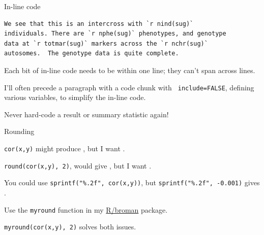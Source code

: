 \documentclass[12pt,t]{beamer}
\begin{document}
\begin{frame}[fragile]{In-line code}

\vspace{24pt}

\begin{lstlisting}
We see that this is an intercross with `r nind(sug)`
individuals. There are `r nphe(sug)` phenotypes, and genotype
data at `r totmar(sug)` markers across the `r nchr(sug)`
autosomes.  The genotype data is quite complete.
\end{lstlisting}

\vfill

\bi
\itemsep12pt
\item Each bit of in-line code needs to be within one line; they
  {\hilit can't}
  span across lines.
\item I'll often precede a paragraph with a code chunk with {\tt
  include=FALSE}, defining various variables, to simplify the in-line
  code.
\item Never hard-code a result or summary statistic again!
\ei

\end{frame}


\begin{frame}{Rounding}

\vspace{24pt}

\bi
\itemsep18pt
\item {\tt cor(x,y)} might produce {\tt {}}, but
I want {\tt {}}.

\item {\tt round(cor(x,y), 2)}, would give {\tt {}}, but I want
{\tt {}}.

\item You could use {\tt sprintf("\%.2f", cor(x,y))}, but
{\tt sprintf("\%.2f", -0.001)} gives {\tt {}}.

\item Use the {\tt myround} function in my
\href{http://github.com/kbroman/broman}{R/broman} package.

\item {\tt myround(cor(x,y), 2)} solves both issues.
\ei

\end{frame}
\end{document}
